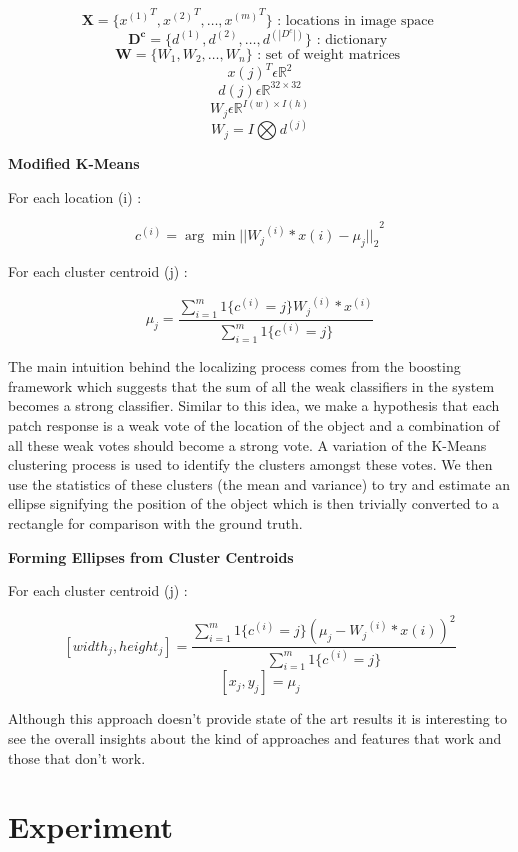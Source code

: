 \documentclass[10pt,twocolumn,letterpaper]{article}
\begin{document}
\[\boldsymbol{X} = \{{x^{(1)}}^T,{x^{(2)}}^T,\ldots,{x^{(m)}}^T\} \text{ : locations in image space } \]
\[\boldsymbol{D^c} = \{{d^{(1)}},{d^{(2)}},\ldots,{d^{(|D^c|)}}\} \text{ : dictionary } \]
\[\boldsymbol{W} = \{W_1,W_2,\ldots,W_n \} \text{ : set of weight matrices } \]
\[ x(j)^T  \epsilon \mathbb{R}^2 \]
\[ d(j)  \epsilon \mathbb{R}^{32 \times 32} \]
\[ W_j \epsilon \mathbb{R}^{I(w) \times I(h)} \]
\[ W_j  = I \bigotimes d^{(j)} \] 

\textbf{Modified K-Means}\newline

For each location (i) :

\[ c^{(i)} = \arg \min {|| {W_j}^{(i)} * x(i) - \mu_j ||_2}^2 \]

For each cluster centroid (j) :

\[ \mu_j =  \frac{\sum_{i=1}^{m}1\{c^{(i)} = j\}{W_j}^{(i)} * x^{(i)}}{\sum_{i=1}^{m}1\{c^{(i)} = j\}} \]

The main intuition behind the localizing process comes from the boosting framework which
suggests that the sum of all the weak classifiers in the system becomes a strong classifier.
Similar to this idea, we make a hypothesis that each patch response is a weak vote of the
location of the object and a combination of all these weak votes should become a strong vote.
A variation of the K-Means clustering process is used to identify the clusters amongst these
votes. We then use the statistics of these clusters (the mean and variance)
to try and estimate an ellipse signifying the position of the object which is then trivially converted
to a rectangle for comparison with the ground truth.\newline 

\textbf{Forming Ellipses from Cluster Centroids} \newline

For each cluster centroid (j) :

\[ [width_j , height_j] =  \frac{\sum_{i=1}^{m}1\{c^{(i)}=j\} (\mu_j - {W_j}^{(i)} * x(i))^2 }{\sum_{i=1}^{m}1\{c^{(i)}=j\}} \]
\[ [x_j , y_j] = \mu_j \]

Although this approach doesn't provide state of the art results it is interesting to see the
overall insights about the kind of approaches and features that work and those that don't work.



\section{Experiment}
\end{document}
